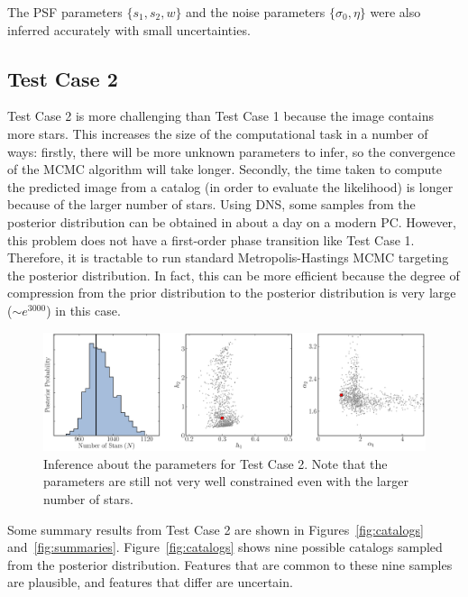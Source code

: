\documentclass[manuscript]{aastex}
\begin{document}
The PSF parameters $\{s_1, s_2, w\}$ and the noise parameters $\{\sigma_0, \eta\}$
were also inferred accurately with small uncertainties.

\subsection{Test Case 2}
Test Case 2 is more challenging than Test Case 1 because the image contains
more stars. This increases the size of the computational task in a number of
ways: firstly, there will be more unknown parameters to infer, so the
convergence of the MCMC algorithm will take longer. Secondly, the time taken
to compute the predicted image from a catalog (in order to evaluate the
likelihood) is longer because of the larger number of stars. Using DNS, some
samples from the posterior distribution can be obtained in about a day on a
modern PC. However, this problem does not have a first-order phase transition
like Test Case 1. Therefore, it is tractable to run standard Metropolis-Hastings
MCMC targeting the posterior distribution. In fact, this can be more efficient
because the degree of compression from the prior distribution to the posterior
distribution is very large ($\sim e^{3000}$) in this case.

\begin{figure}
\begin{center}
\includegraphics[width=\textwidth]{Figures/inference2.eps}
\end{center}
\caption{Inference about the parameters for Test Case 2. Note that the
parameters are still not very well constrained even with the larger number of
stars.\label{fig:results2}}
\end{figure}

Some summary results from Test Case 2 are shown in Figures~\ref{fig:catalogs}
and~\ref{fig:summaries}. Figure~\ref{fig:catalogs} shows nine possible catalogs
sampled from the posterior
distribution. Features that are common to these nine samples are plausible, and
features that differ are uncertain.
\end{document}
